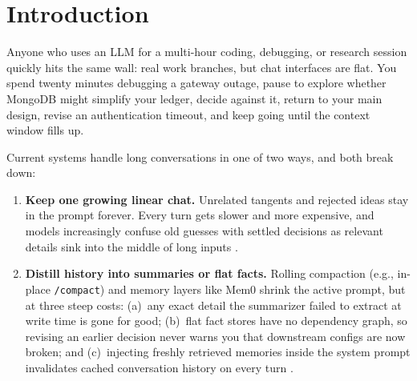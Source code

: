 \documentclass[10pt,twocolumn]{article}
\begin{document}
\section{Introduction}

Anyone who uses an LLM for a multi-hour coding, debugging, or research session quickly hits the same wall: real work branches, but chat interfaces are flat. You spend twenty minutes debugging a gateway outage, pause to explore whether MongoDB might simplify your ledger, decide against it, return to your main design, revise an authentication timeout, and keep going until the context window fills up.

Current systems handle long conversations in one of two ways, and both break down:
\begin{enumerate}
  \item \textbf{Keep one growing linear chat.} Unrelated tangents and rejected ideas stay in the prompt forever. Every turn gets slower and more expensive, and models increasingly confuse old guesses with settled decisions as relevant details sink into the middle of long inputs \citep{liu2024lostinthemiddle}.
  \item \textbf{Distill history into summaries or flat facts.} Rolling compaction (e.g., in-place \texttt{/compact}) and memory layers like Mem0 \citep{chhikara2025mem0} shrink the active prompt, but at three steep costs: (a)~any exact detail the summarizer failed to extract at write time is gone for good; (b)~flat fact stores have no dependency graph, so revising an earlier decision never warns you that downstream configs are now broken; and (c)~injecting freshly retrieved memories inside the system prompt invalidates cached conversation history on every turn \citep{zheng2024sglang}.
\end{enumerate}
\end{document}
